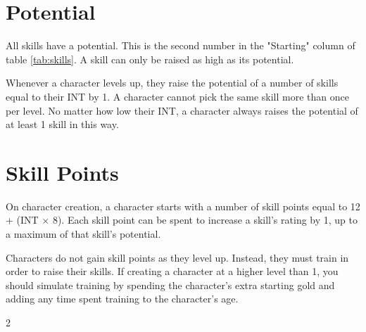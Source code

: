 \begin{multicols}{2}
    \section{Potential}
    All skills have a potential. This is the second number in the "Starting"
    column of table \ref{tab:skills}. A skill can only be raised as high as
    its potential.

    Whenever a character levels up, they raise the potential of a number of
    skills equal to their INT by 1. A character cannot pick the same skill more
    than once per level. No matter how low their INT, a character always raises
    the potential of at least 1 skill in this way.

    \section{Skill Points}
    On character creation, a character starts with a number of skill points
    equal to 12 + (INT $\times$ 8). Each skill point can be spent to increase
    a skill's rating by 1, up to a maximum of that skill's potential.

    Characters do not gain skill points as they level up. Instead, they must
    train in order to raise their skills. If creating a character at a higher
    level than 1, you should simulate training by spending the character's
    extra starting gold and adding any time spent training to the character's
    age.
\end{multicols}{2}

